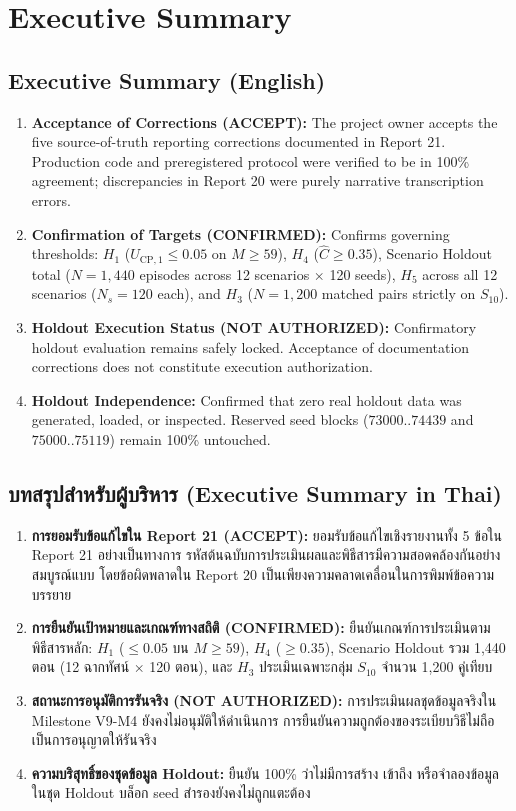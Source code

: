 \documentclass[10pt,a4paper]{article}
\begin{document}
\section{Executive Summary}

\subsection{Executive Summary (English)}
\begin{enumerate}
    \item \textbf{Acceptance of Corrections (ACCEPT):} The project owner accepts the five source-of-truth reporting corrections documented in Report 21. Production code and preregistered protocol were verified to be in 100\% agreement; discrepancies in Report 20 were purely narrative transcription errors.
    \item \textbf{Confirmation of Targets (CONFIRMED):} Confirms governing thresholds: $H_1$ ($U_{\mathrm{CP}, 1} \le 0.05$ on $M \ge 59$), $H_4$ ($\hat{C} \ge 0.35$), Scenario Holdout total ($N = 1,440$ episodes across 12 scenarios $\times$ 120 seeds), $H_5$ across all 12 scenarios ($N_s = 120$ each), and $H_3$ ($N = 1,200$ matched pairs strictly on $S_{10}$).
    \item \textbf{Holdout Execution Status (NOT AUTHORIZED):} Confirmatory holdout evaluation remains safely locked. Acceptance of documentation corrections does not constitute execution authorization.
    \item \textbf{Holdout Independence:} Confirmed that zero real holdout data was generated, loaded, or inspected. Reserved seed blocks ($73000..74439$ and $75000..75119$) remain 100\% untouched.
\end{enumerate}

\subsection{\thaifont บทสรุปสำหรับผู้บริหาร (Executive Summary in Thai)}
\begin{enumerate}
    \item \textbf{\thaifont การยอมรับข้อแก้ไขใน Report 21 (ACCEPT):} \thaifont ยอมรับข้อแก้ไขเชิงรายงานทั้ง 5 ข้อใน Report 21 อย่างเป็นทางการ รหัสต้นฉบับการประเมินผลและพิธีสารมีความสอดคล้องกันอย่างสมบูรณ์แบบ โดยข้อผิดพลาดใน Report 20 เป็นเพียงความคลาดเคลื่อนในการพิมพ์ข้อความบรรยาย
    \item \textbf{\thaifont การยืนยันเป้าหมายและเกณฑ์ทางสถิติ (CONFIRMED):} \thaifont ยืนยันเกณฑ์การประเมินตามพิธีสารหลัก: $H_1$ ($\le 0.05$ บน $M \ge 59$), $H_4$ ($\ge 0.35$), Scenario Holdout รวม 1,440 ตอน (12 ฉากทัศน์ $\times$ 120 ตอน), และ $H_3$ ประเมินเฉพาะกลุ่ม $S_{10}$ จำนวน 1,200 คู่เทียบ
    \item \textbf{\thaifont สถานะการอนุมัติการรันจริง (NOT AUTHORIZED):} \thaifont การประเมินผลชุดข้อมูลจริงใน Milestone V9-M4 ยังคงไม่อนุมัติให้ดำเนินการ การยืนยันความถูกต้องของระเบียบวิธีไม่ถือเป็นการอนุญาตให้รันจริง
    \item \textbf{\thaifont ความบริสุทธิ์ของชุดข้อมูล Holdout:} \thaifont ยืนยัน 100\% ว่าไม่มีการสร้าง เข้าถึง หรือจำลองข้อมูลในชุด Holdout บล็อก seed สำรองยังคงไม่ถูกแตะต้อง
\end{enumerate}
\end{document}
